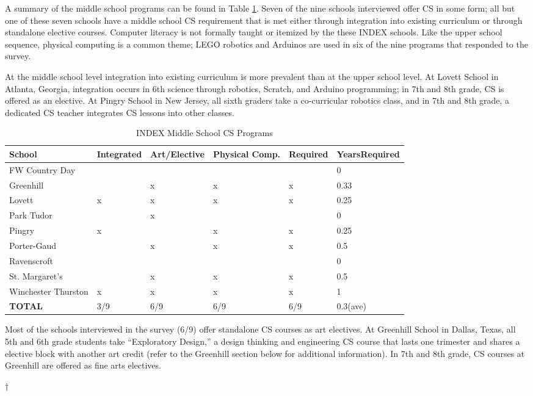 A summary of the middle school programs can be found in Table \ref{indexMS}. Seven of the nine schools interviewed offer CS in some form; all but one of these seven schools have a middle school CS requirement that is met either through integration into existing curriculum or through standalone elective courses. Computer literacy is not formally taught or itemized by the these INDEX schools. Like the upper school sequence, physical computing is a common theme; LEGO robotics and Arduinos are used in six of the nine programs that responded to the survey.\par
At the middle school level integration into existing curriculum is more prevalent than at the upper school level. At Lovett School in Atlanta, Georgia, integration occurs in 6th science through robotics, Scratch, and Arduino programming; in 7th and 8th grade, CS is offered as an elective. At Pingry School in New Jersey, all sixth graders take a co-curricular robotics class, and in 7th and 8th grade, a dedicated CS teacher integrates CS lessons into other classes.\par 
\begin{table}[]
\centering
\caption{INDEX Middle School CS Programs}
\label{indexMS}
\begin{tabular}{|l|p{2cm}|p{2cm}|p{2cm}|p{2cm}|p{2cm}|}\hline
\textbf{School} &	\textbf{Integrated}	& \textbf{Art/\newline Elective}	& \textbf{Physical Comp.} & \textbf{Required}	& \textbf{Years\newline Required}\\ \hline
FW Country Day &&&&	&0\\
Greenhill & &		x & 	x &	x &0.33\\
Lovett	& x &	x	& x	& x &0.25\\
Park Tudor &	& 	x &	 &&0		\\
Pingry	& x &  &			x &	x &0.25\\
Porter-Gaud	& &	x&	x &	x&0.5 \\
Ravenscroft	&&&&&0		\\
St. Margaret's & &		x &	x &	x&0.5\\ 
Winchester Thurston	& x  &	x &	x &	x&1\\\hline
\textbf{TOTAL}	& 3/9 &	6/9  &	6/9	& 6/9 &0.3(ave)\\\hline
\end{tabular}
\end{table}
Most of the schools interviewed in the survey (6/9) offer standalone CS courses as art electives. At Greenhill School in Dallas, Texas, all 5th and 6th grade students take ``Exploratory Design,'' a design thinking and engineering CS course that lasts one trimester and shares a elective block with another art credit (refer to the Greenhill section below for additional information). In 7th and 8th grade, CS courses at Greenhill are offered as fine arts electives. \par†
